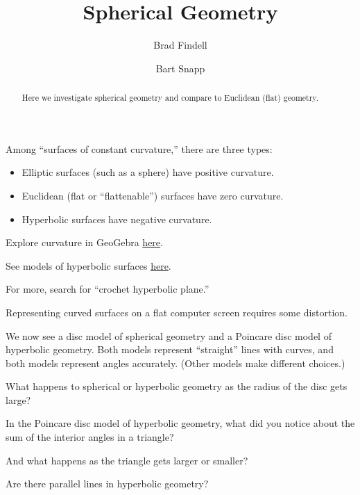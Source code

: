 \documentclass{ximera}
\title{Spherical Geometry}
\author{Brad Findell \and Bart Snapp}
\begin{document}
\begin{abstract}
Here we investigate spherical geometry and compare to Euclidean (flat) geometry. 
\end{abstract}
\maketitle


\begin{question}
Among ``surfaces of constant curvature,'' there are three types:
\begin{itemize}
\item Elliptic surfaces (such as a sphere) have positive curvature.
\item Euclidean (flat or ``flattenable'') surfaces have zero curvature.
\item Hyperbolic surfaces have negative curvature.
\end{itemize}
Explore curvature in GeoGebra \href{https://www.geogebra.org/m/qgyhqgt9}{here}. 

See models of hyperbolic surfaces \href{https://www.theiff.org/oexhibits/oe1e.html}{here}.

For more, search for ``crochet hyperbolic plane.''
\end{question}

\begin{question}
Representing curved surfaces on a flat computer screen requires some distortion.

We now see a disc model of spherical geometry and a Poincare disc model of hyperbolic
geometry. Both models represent ``straight'' lines with curves, and both models represent angles accurately.
(Other models make different choices.)

What happens to spherical or hyperbolic geometry as the radius of the disc gets large?

\end{question}


\begin{question}
In the Poincare disc model of hyperbolic geometry, what did you notice about the sum of the interior angles in a triangle? 

And what happens as the triangle gets larger or smaller?
\end{question}


\begin{question}
Are there parallel lines in hyperbolic geometry?
\end{question}
\end{document}
